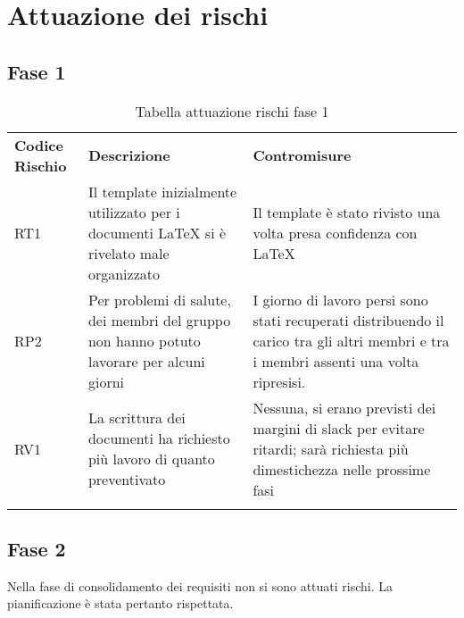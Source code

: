 \section{Attuazione dei rischi}
\label{sec:attuazione_rischi}
\subsection{Fase 1}
\label{sec:fase_1}
\begin{center}

\renewcommand{\arraystretch}{1.5}
	\begin{longtable}[H]{  	>{\Centering}p{2cm}	
							>{\RaggedRight}p{6cm}	
							>{\RaggedRight}p{6cm}  
							}
							
		\rowcolor{tableHeadYellow}
		\textbf{Codice Rischio}   & \textbf{Descrizione} & \textbf{Contromisure}\\ 

		RT1	&Il template inizialmente utilizzato per i documenti LaTeX si è rivelato male organizzato	&Il template è stato rivisto una volta presa confidenza con LaTeX\\
		RP2	&Per problemi di salute, dei membri del gruppo non hanno potuto lavorare per alcuni giorni	&I giorno di lavoro persi sono stati recuperati distribuendo il carico tra gli altri membri e tra i membri assenti una volta ripresisi.\\
		RV1	&La scrittura dei documenti ha richiesto più lavoro di quanto preventivato	&Nessuna, si erano previsti dei margini di slack per evitare ritardi; sarà richiesta più dimestichezza nelle prossime fasi\\

		\rowcolor{white}
		\caption{Tabella attuazione rischi fase 1}
	\end{longtable}
\end{center}

\subsection{Fase 2}
\label{sec:fase_2}
\begin{center}
Nella fase di consolidamento dei requisiti non si sono attuati rischi.  \newline
La pianificazione è stata pertanto rispettata.
\end{center}


